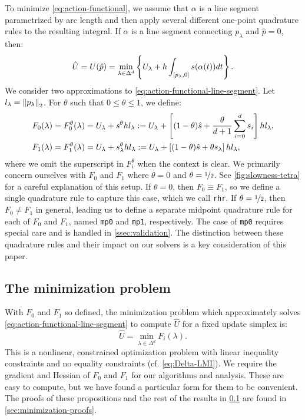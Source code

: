 \documentclass[sisc-eikonal.tex]{subfiles}
\begin{document}
To minimize \cref{eq:action-functional}, we assume that $\alpha$ is a
line segment parametrized by arc length and then apply several
different one-point quadrature rules to the resulting integral. If
$\alpha$ is a line segment connecting $p_\lambda$ and $\hat{p} = 0$,
then:
\begin{equation}
  \label{eq:action-functional-line-segment}
  \hat{U} = U(\hat{p}) = \min_{\lambda \in \Delta^d} \set{U_\lambda + h \int_{[p_\lambda, 0]} s(\alpha(t))dt}.
\end{equation}
We consider two approximations to
\cref{eq:action-functional-line-segment}. Let
$l_\lambda = \left\|p_\lambda\right\|_2$. For $\theta$ such that
$0 \leq \theta \leq 1$, we define:
\begin{align}
  F_0(\lambda) = F_0^\theta(\lambda) &= U_\lambda + s^{\theta} h l_\lambda := U_\lambda + \squareb{(1-\theta)\hat{s} + \frac{\theta}{d + 1} \sum_{i=0}^d s_i} h l_\lambda, \label{eq:f0-definition} \\
  F_1(\lambda) = F_1^\theta(\lambda) &= U_\lambda + s^{\theta}_\lambda h l_\lambda := U_\lambda + \squareb{(1-\theta)\hat{s} + \theta s_\lambda} h l_\lambda,
\end{align}
where we omit the superscript in $F_i^\theta$ when the context is
clear. We primarily concern ourselves with $F_0$ and $F_1$ where
$\theta = 0$ and $\theta = \nicefrac{1}{2}$. See
\cref{fig:slowness-tetra} for a careful explanation of this setup. If
$\theta = 0$, then $F_0 \equiv F_1$, so we define a single quadrature
rule to capture this case, which we call \texttt{rhr}. If
$\theta = \nicefrac{1}{2}$, then $F_0 \neq F_1$ in general, leading us
to define a separate midpoint quadrature rule for each of $F_0$ and
$F_1$, named \texttt{mp0} and \texttt{mp1}, respectively. The case of
\texttt{mp0} requires special care and is handled in
\cref{ssec:validation}. The distinction between these quadrature rules
and their impact on our solvers is a key consideration of this paper.

\subsection{The minimization problem}\label{ssec:minimization-problem}

With $F_0$ and $F_1$ so defined, the minimization problem which
approximately solves \cref{eq:action-functional-line-segment} to
compute $\hat{U}$ for a fixed update simplex is:
\begin{equation}
  \label{eq:constrained-minimization}
  \hat{U} = \min_{\lambda \in \Delta^d} F_i(\lambda).
\end{equation}
This is a nonlinear, constrained optimization problem with linear
inequality constraints and no equality constraints (cf.\@
\cref{eq:Delta-LMI}). We require the gradient and Hessian of $F_0$ and
$F_1$ for our algorithms and analysis. These are easy to compute, but
we have found a particular form for them to be convenient. The proofs
of these propositions and the rest of the results in
\cref{ssec:minimization-problem} are found in
\cref{sec:minimization-proofs}.
\end{document}
